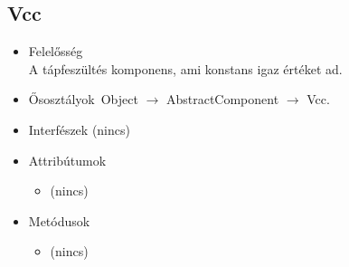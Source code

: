 \subsection{Vcc}
\begin{itemize}
\item Felelősség\\
A tápfeszültés komponens, ami konstans igaz értéket ad.
\item Ősosztályok\ Object $\rightarrow{}$ AbstractComponent $\rightarrow{}$ Vcc.
\item Interfészek (nincs)
\item Attribútumok $\ $
\begin{itemize}
\item (nincs)
\end{itemize}
\item Metódusok$\ $
\begin{itemize}
\item (nincs)
\end{itemize}
\end{itemize}

